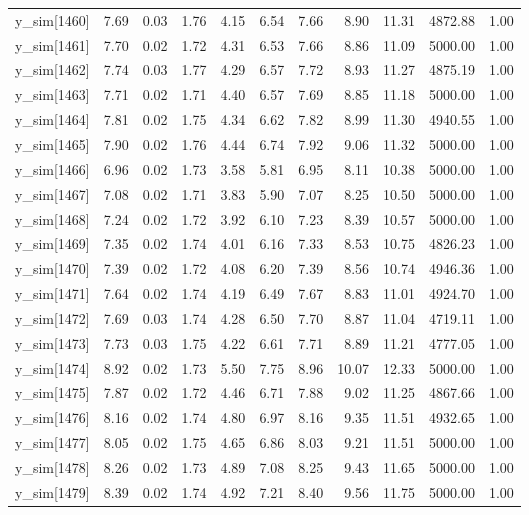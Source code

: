 \begin{table}[ht]
\begin{tabular}{rrrrrrrrrrr}
  y\_sim[1460] & 7.69 & 0.03 & 1.76 & 4.15 & 6.54 & 7.66 & 8.90 & 11.31 & 4872.88 & 1.00 \\ 
  y\_sim[1461] & 7.70 & 0.02 & 1.72 & 4.31 & 6.53 & 7.66 & 8.86 & 11.09 & 5000.00 & 1.00 \\ 
  y\_sim[1462] & 7.74 & 0.03 & 1.77 & 4.29 & 6.57 & 7.72 & 8.93 & 11.27 & 4875.19 & 1.00 \\ 
  y\_sim[1463] & 7.71 & 0.02 & 1.71 & 4.40 & 6.57 & 7.69 & 8.85 & 11.18 & 5000.00 & 1.00 \\ 
  y\_sim[1464] & 7.81 & 0.02 & 1.75 & 4.34 & 6.62 & 7.82 & 8.99 & 11.30 & 4940.55 & 1.00 \\ 
  y\_sim[1465] & 7.90 & 0.02 & 1.76 & 4.44 & 6.74 & 7.92 & 9.06 & 11.32 & 5000.00 & 1.00 \\ 
  y\_sim[1466] & 6.96 & 0.02 & 1.73 & 3.58 & 5.81 & 6.95 & 8.11 & 10.38 & 5000.00 & 1.00 \\ 
  y\_sim[1467] & 7.08 & 0.02 & 1.71 & 3.83 & 5.90 & 7.07 & 8.25 & 10.50 & 5000.00 & 1.00 \\ 
  y\_sim[1468] & 7.24 & 0.02 & 1.72 & 3.92 & 6.10 & 7.23 & 8.39 & 10.57 & 5000.00 & 1.00 \\ 
  y\_sim[1469] & 7.35 & 0.02 & 1.74 & 4.01 & 6.16 & 7.33 & 8.53 & 10.75 & 4826.23 & 1.00 \\ 
  y\_sim[1470] & 7.39 & 0.02 & 1.72 & 4.08 & 6.20 & 7.39 & 8.56 & 10.74 & 4946.36 & 1.00 \\ 
  y\_sim[1471] & 7.64 & 0.02 & 1.74 & 4.19 & 6.49 & 7.67 & 8.83 & 11.01 & 4924.70 & 1.00 \\ 
  y\_sim[1472] & 7.69 & 0.03 & 1.74 & 4.28 & 6.50 & 7.70 & 8.87 & 11.04 & 4719.11 & 1.00 \\ 
  y\_sim[1473] & 7.73 & 0.03 & 1.75 & 4.22 & 6.61 & 7.71 & 8.89 & 11.21 & 4777.05 & 1.00 \\ 
  y\_sim[1474] & 8.92 & 0.02 & 1.73 & 5.50 & 7.75 & 8.96 & 10.07 & 12.33 & 5000.00 & 1.00 \\ 
  y\_sim[1475] & 7.87 & 0.02 & 1.72 & 4.46 & 6.71 & 7.88 & 9.02 & 11.25 & 4867.66 & 1.00 \\ 
  y\_sim[1476] & 8.16 & 0.02 & 1.74 & 4.80 & 6.97 & 8.16 & 9.35 & 11.51 & 4932.65 & 1.00 \\ 
  y\_sim[1477] & 8.05 & 0.02 & 1.75 & 4.65 & 6.86 & 8.03 & 9.21 & 11.51 & 5000.00 & 1.00 \\ 
  y\_sim[1478] & 8.26 & 0.02 & 1.73 & 4.89 & 7.08 & 8.25 & 9.43 & 11.65 & 5000.00 & 1.00 \\ 
  y\_sim[1479] & 8.39 & 0.02 & 1.74 & 4.92 & 7.21 & 8.40 & 9.56 & 11.75 & 5000.00 & 1.00 \\ 

\end{tabular}
\end{table}
